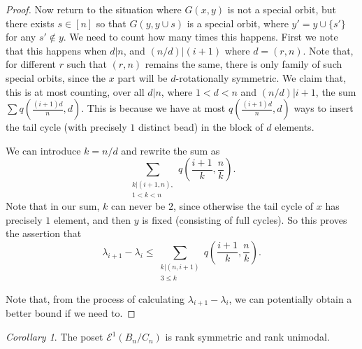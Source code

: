 \documentclass[10 pt]{amsart}
\theoremstyle{plain}
\theoremstyle{definition}
\theoremstyle{remark}
\numberwithin{equation}{section}
\newtheorem{cor}[thm]{Corollary}
\theoremstyle{remark}
\newcommand{\dstyle}{\displaystyle}
\begin{document}
\begin{proof}
Now return to the situation where $G{(x , y)}$ is not a special orbit, but there exists $s \in [n]$ so that $G{(y , y \cup s)}$ is a special orbit, where $y' = y \cup \{s'\}$ for any $s' \notin y$. We need to count how many times this happens.  First we note that this happens when $d | n$, and $(n/d) | (i+1)$ where $d = (r, n)$. Note that, for different $r$ such that $(r, n)$ remains the same, there is only family of such special orbits, since the $x$ part will be $d$-rotationally symmetric.  We claim that, this  is at most counting,  over all $d | n$, where $1 < d < n$ and $(n/d) | i+1 $, the sum $\dstyle \sum q \left(\frac{(i+1)d}{n}, d\right)$.  This is because we have at most $q(\frac{(i+1)d}{n}, d)$ ways to insert the tail cycle (with precisely $1$ distinct bead) in the block of $d$ elements. 

We can introduce $k = n/d$  and rewrite the sum as 
$$\sum_{\substack{k | (i+1, n), \\ 1 < k < n}} q\left(\frac{i+1}{k}, \frac{n}{k}\right).$$ Note that in our sum, $k$ can never be $2$, since otherwise the tail cycle of $x$  has precisely $1$ element, and then $y$ is fixed (consisting of full cycles). So this proves the assertion that $$\lambda_{i+1} - \lambda_i \le \sum_{\substack{k | (n , i+1) \\ 3 \le k }} q (\frac{i+1}{k}, \frac{n}{k}). $$ 
 
Note that, from the process of calculating $\lambda_{i+1} - \lambda_{i}$, we can potentially obtain a better bound   if we need to. 
\end{proof}
\begin{cor}{\label{cor:cyclic_unimodal}} 
The poset $\mathcal E^1(B_n/C_n)$ is rank symmetric and rank unimodal.
\end{cor}
\end{document}
